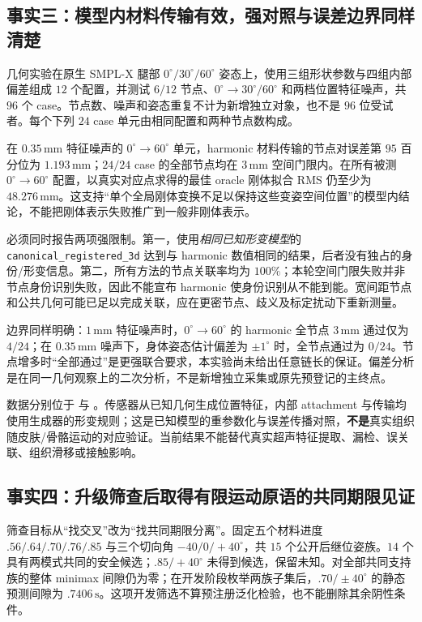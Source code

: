 \documentclass[11pt,a4paper,fontset=fandol]{ctexart}
\theoremstyle{definition}
\theoremstyle{remark}\newtheorem{remark}[theorem]{说明}
\numberwithin{equation}{section}
\begin{document}
\subsection{事实三：模型内材料传输有效，强对照与误差边界同样清楚}
几何实验在原生 SMPL-X 腿部 $0^\circ/30^\circ/60^\circ$ 姿态上，使用三组形状参数与四组内部偏差组成 $12$ 个配置，并测试 $6/12$ 节点、$0^\circ\!\to30^\circ/60^\circ$ 和两档位置特征噪声，共 $96$ 个 case。节点数、噪声和姿态重复不计为新增独立对象，也不是 $96$ 位受试者。每个下列 $24$ case 单元由相同配置和两种节点数构成。

在 $0.35\,\mathrm{mm}$ 特征噪声的 $0^\circ\!\to60^\circ$ 单元，harmonic 材料传输的节点对误差第 $95$ 百分位为 $1.193\,\mathrm{mm}$；$24/24$ case 的全部节点均在 $3\,\mathrm{mm}$ 空间门限内。在所有被测 $0^\circ\!\to60^\circ$ 配置，以真实对应点求得的最佳 oracle 刚体拟合 RMS 仍至少为 $48.276\,\mathrm{mm}$。这支持“单个全局刚体变换不足以保持这些变姿空间位置”的模型内结论，不能把刚体表示失败推广到一般非刚体表示。

必须同时报告两项强限制。第一，使用\emph{相同已知形变模型}的 \texttt{canonical\_registered\_3d} 达到与 harmonic 数值相同的结果，后者没有独占的身份/形变信息。第二，所有方法的节点关联率均为 $100\%$；本轮空间门限失败并非节点身份识别失败，因此不能宣布 harmonic 使身份识别从不能到能。宽间距节点和公共几何可能已足以完成关联，应在更密节点、歧义及标定扰动下重新测量。

边界同样明确：$1\,\mathrm{mm}$ 特征噪声时，$0^\circ\!\to60^\circ$ 的 harmonic 全节点 $3\,\mathrm{mm}$ 通过仅为 $4/24$；在 $0.35\,\mathrm{mm}$ 噪声下，身体姿态估计偏差为 $\pm1^\circ$ 时，全节点通过为 $0/24$。节点增多时“全部通过”是更强联合要求，本实验尚未给出任意链长的保证。偏差分析是在同一几何观察上的二次分析，不是新增独立采集或原先预登记的主终点。

数据分别位于  与 。传感器从已知几何生成位置特征，内部 attachment 与传输均使用生成器的形变规则；这是已知模型的重参数化与误差传播对照，\textbf{不是}真实组织随皮肤/骨骼运动的对应验证。当前结果不能替代真实超声特征提取、漏检、误关联、组织滑移或接触影响。



\subsection{事实四：升级筛查后取得有限运动原语的共同期限见证}
\label{sec:motor_scope_witness}
筛查目标从“找交叉”改为“找共同期限分离”。固定五个材料进度 $.56/.64/.70/.76/.85$ 与三个切向角 $-40/0/+40^\circ$，共 $15$ 个公开后继位姿族。$14$ 个具有两模式共同的安全候选；$.85/+40^\circ$ 未得到候选，保留未知。对全部共同支持族的整体 minimax 间隙仍为零；在开发阶段枚举两族子集后，$.70/\pm40^\circ$ 的静态预测间隙为 $.7406\,\mathrm{s}$。这项开发筛选不算预注册泛化检验，也不能删除其余阴性条件。
\end{document}
